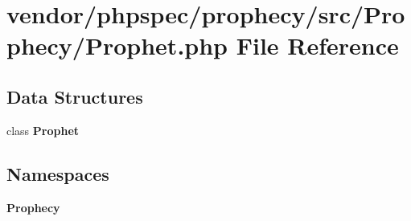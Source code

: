 \section{vendor/phpspec/prophecy/src/\+Prophecy/\+Prophet.php File Reference}
\label{_prophet_8php}
\subsection*{Data Structures}
\begin{DoxyCompactItemize}
\item 
class {\bf Prophet}
\end{DoxyCompactItemize}
\subsection*{Namespaces}
\begin{DoxyCompactItemize}
\item 
 {\bf Prophecy}
\end{DoxyCompactItemize}
